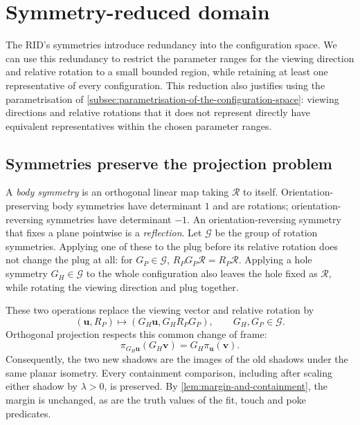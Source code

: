 \section{Symmetry-reduced domain}\label{sec:symmetry-reduced-domain}

The RID's symmetries introduce redundancy into the configuration space.
We can use this redundancy to restrict the parameter ranges for the viewing
direction and relative rotation to a small bounded region, while retaining
at least one representative of every configuration. This reduction also
justifies using the parametrisation of
\cref{subsec:parametrisation-of-the-configuration-space}: viewing directions
and relative rotations that it does not represent directly have equivalent
representatives within the chosen parameter ranges.

\subsection{Symmetries preserve the projection problem}\label{subsec:symmetries-preserve-the-projection-problem}

A \emph{body symmetry} is an orthogonal linear map taking $\mathcal R$ to itself.
Orientation-preserving body symmetries have determinant $1$ and are rotations;
orientation-reversing symmetries have determinant $-1$.
An orientation-reversing symmetry that fixes a plane pointwise is a
\emph{reflection}. Let $\mathcal G$ be the group of rotation symmetries.
Applying one of these to the plug before its
relative rotation does not change the plug at all: for $G_{P}\in\mathcal G$,
$R_{P}G_{P}\mathcal R=R_{P}\mathcal R$. Applying a hole symmetry $G_{H}\in\mathcal G$ to the whole
configuration also leaves the hole fixed as $\mathcal R$, while rotating the
viewing direction and plug together.

These two operations replace the viewing vector and relative rotation by
\[
  (\mathbf u,R_{P})\longmapsto(G_{H}\mathbf u,G_{H}R_{P}G_{P}),
  \qquad G_{H},G_{P}\in\mathcal G.
\]
Orthogonal projection respects this common change of frame:
\[
  \pi_{G_{H}\mathbf u}(G_{H}\mathbf v)=G_{H}\pi_{\mathbf u}(\mathbf v).
\]
Consequently, the two new shadows are the images of the old shadows under
the same planar isometry. Every containment comparison, including after
scaling either shadow by $\lambda>0$, is preserved. By
\cref{lem:margin-and-containment}, the margin is unchanged, as are the
truth values of the fit, touch and poke predicates.

